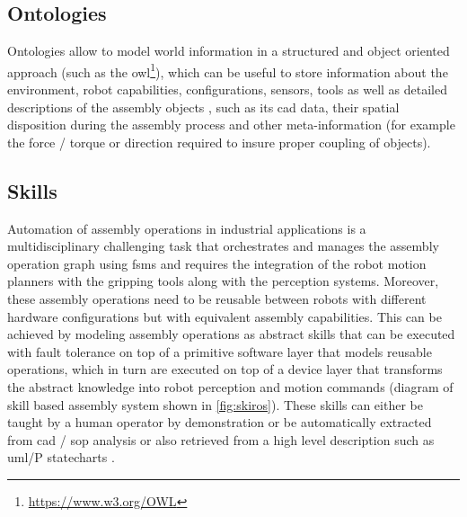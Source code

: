 \subsection{Ontologies}

Ontologies allow to model world information in a structured and object oriented approach \cite{Lemaignan2012,Stenmark2015} (such as the \gls{owl}\footnote{\url{https://www.w3.org/OWL}}), which can be useful to store information about the environment, robot capabilities, configurations, sensors, tools as well as detailed descriptions of the assembly objects \cite{Perzylo2015}, such as its \gls{cad} data, their spatial disposition during the assembly process and other meta-information (for example the force / torque or direction required to insure proper coupling of objects).



\subsection{Skills}

Automation of assembly operations in industrial applications \cite{Thomas2001,Patel2012} is a multidisciplinary challenging task that orchestrates and manages the assembly operation graph using \glspl{fsm} \cite{Smits2010,Stefan2014} and requires the integration of the robot motion planners with the gripping tools \cite{Thomas2015} along with the perception systems. Moreover, these assembly operations need to be reusable \cite{Andersen2014,Butting2016} between robots with different hardware configurations \cite{Thomas2002} but with equivalent assembly capabilities. This can be achieved by modeling assembly operations as abstract skills \cite{aimm2012,Pedersen2014,Holz2015,Rovida2017} that can be executed with fault tolerance \cite{ThomasICRA2003} on top of a primitive software layer that models reusable operations, which in turn are executed on top of a device layer that transforms the abstract knowledge into robot perception and motion commands (diagram of skill based assembly system shown in \cref{fig:skiros}). These skills can either be taught by a human operator by demonstration or be automatically extracted from \gls{cad} / \gls{sop} analysis \cite{Lavoue2005,Tenorth2013cad} or also retrieved from a high level description such as \gls{uml}/P statecharts \cite{ThomasICRA2013}.


